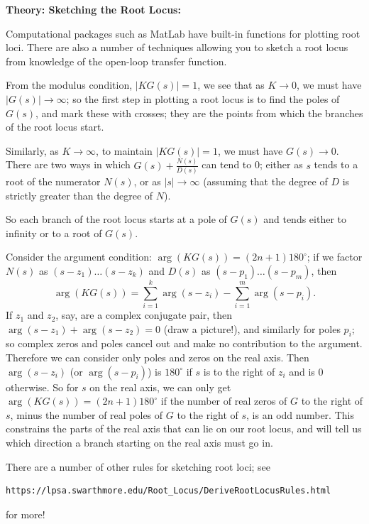 \documentclass{article}
\begin{document}
\clearpage











\textbf{Theory: Sketching the Root Locus:}\bigskip

Computational packages such as MatLab have built-in functions for plotting root loci. There are also a number of techniques allowing you to sketch a root locus from knowledge of the open-loop transfer function.

From the modulus condition, $|KG(s)|=1$, we see that as $K\to 0$, we must have $|G(s)|\to\infty$; so the first step in plotting a root locus is to find the poles of $G(s)$, and mark these with crosses; they are the points from which the branches of the root locus start.

Similarly, as $K\to\infty$, to maintain $|KG(s)|=1$, we must have $G(s)\to 0$. There are two ways in which $G(s)+\frac{N(s)}{D(s)}$ can tend to 0; either as $s$ tends to a root of the numerator $N(s)$, or as $|s|\to \infty$ (assuming that the degree of $D$ is strictly greater than the degree of $N$).

So each branch of the root locus starts at a pole of $G(s)$ and tends either to infinity or to a root of $G(s)$.\medskip

Consider the argument condition: $\arg(KG(s))=(2n+1)180^\circ$; if we factor $N(s)$ as $(s-z_1)\hdots(s-z_k)$ and $D(s)$ as $(s-p_1)\hdots(s-p_m)$, then
\[\arg(KG(s))=\sum_{i=1}^k \arg(s-z_i) - \sum_{i=1}^m \arg(s-p_i).\]
If $z_1$ and $z_2$, say, are a complex conjugate pair, then $\arg(s-z_1)+\arg(s-z_2)=0$ (draw a picture!), and similarly for poles $p_i$; so complex zeros and poles cancel out and make no contribution to the argument. Therefore we can consider only poles and zeros on the real axis. Then $\arg(s-z_i)$ (or $\arg(s-p_i)$) is $180^\circ$ if $s$ is to the right of $z_i$ and is 0 otherwise. So for $s$ on the real axis, we can only get $\arg(KG(s))=(2n+1)180^\circ$ if the number of real zeros of $G$ to the right of $s$, minus the number of real poles of $G$ to the right of $s$, is an odd number. This constrains the parts of the real axis that can lie on our root locus, and will tell us which direction a branch starting on the real axis must go in.\medskip



There are a number of other rules for sketching root loci; see \begin{verbatim}https://lpsa.swarthmore.edu/Root_Locus/DeriveRootLocusRules.html\end{verbatim} for more!
\end{document}
